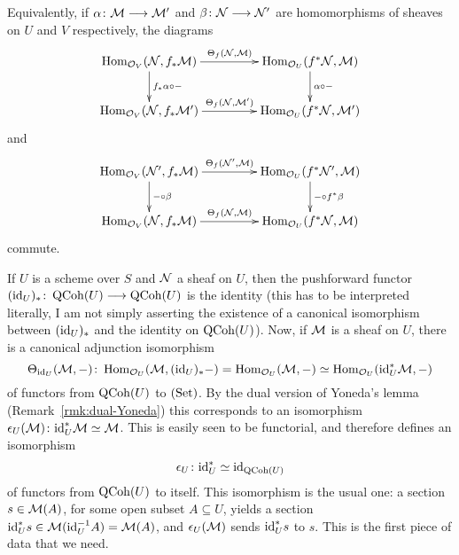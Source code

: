 \begin{3   FIBERED CATEGORIES}
\begin{3.2 Examples of fibered categories}
Equivalently, if $\alpha \colon \cM \arr \cM'$ and $\beta \colon \cN \arr \cN'$ are homomorphisms of \qc sheaves on $U$ and $V$ respectively, the diagrams
   \[
   \xymatrix@C+20pt{
   \hom_{\cO_V}(\cN, f_*\cM)
   \ar[d]^{f_* \alpha \circ -}
   \ar[r]^{\Theta_f(\cN,\cM)}  &
   \hom_{\cO_U}(f^* \cN, \cM)
   \ar[d]^{\alpha \circ -} \\
   \hom_{\cO_V}(\cN, f_*\cM')
   \ar[r]^{\Theta_f(\cN,\cM')} &
   \hom_{\cO_U}(f^* \cN, \cM')
   }
   \]
and
   \[
   \xymatrix@C+20pt{
   \hom_{\cO_V}(\cN', f_*\cM)
   \ar[r]^{\Theta_f(\cN',\cM)} \ar[d]^{- \circ \beta} &
   \hom_{\cO_U}(f^* \cN', \cM)
   \ar[d]^{- \circ f^*\beta}  \\
   \hom_{\cO_V}(\cN, f_*\cM)
   \ar[r]^{\Theta_f(\cN,\cM)} &
   \hom_{\cO_U}(f^{*}\cN, \cM)
   }
   \]
commute.

If $U$ is a scheme over $S$ and $\mathcal{N}$  a \qc sheaf on $U$, then the pushforward functor $(\id_U)_* \colon \qcoh U \arr \qcoh U$ is the identity (this has to be interpreted literally, I am not simply asserting the existence of a canonical isomorphism between $(\mathrm{id}_U)_*$ and the identity on $\operatorname{QCoh}(U)$). Now, if $\mathcal{M}$ is a \qc sheaf on $U$, there is a canonical adjunction isomorphism
   \[
   \Theta_{\mathrm{id}_U}(\mathcal{M}, -) \colon
   \operatorname{Hom}_{\mathcal{O}_U}(\mathcal{M}, (\mathrm{id}_U)_*-) = 
   \operatorname{Hom}_{\mathcal{O}_U}(\mathcal{M}, -) \simeq
   \operatorname{Hom}_{\mathcal{O}_U}(\mathrm{id}_U^*\mathcal{M}, -)
   \]
of functors from $\operatorname{QCoh}(U)$ to $(\mathrm{Set})$. By the dual version of Yoneda's lemma (Remark~\ref{rmk:dual-Yoneda}) this corresponds to an isomorphism $\epsilon_U (\mathcal{M}) \colon \mathrm{id}_U^*\mathcal{M} \simeq \mathcal{M}$. This is easily seen to be functorial, and therefore defines an isomorphism
   \[
   \epsilon_U \colon \mathrm{id}_U^* \simeq \mathrm{id}_{\operatorname{QCoh}(U)}   
   \]
of functors from $\operatorname{QCoh}(U)$ to itself. This isomorphism is the usual one: a section $s \in \mathcal{M}(A)$, for some open subset $A \subseteq U$, yields a section $\mathrm{id}_U^* s \in \mathcal{M}(\mathrm{id}_U ^{-1} A) = \mathcal{M}(A)$, and $\epsilon_U(\mathcal{M})$ sends $\mathrm{id}_U^* s$ to $s$. This is the first piece of data that we need.


\end{3.2 Examples of fibered categories}
\end{3   FIBERED CATEGORIES}
